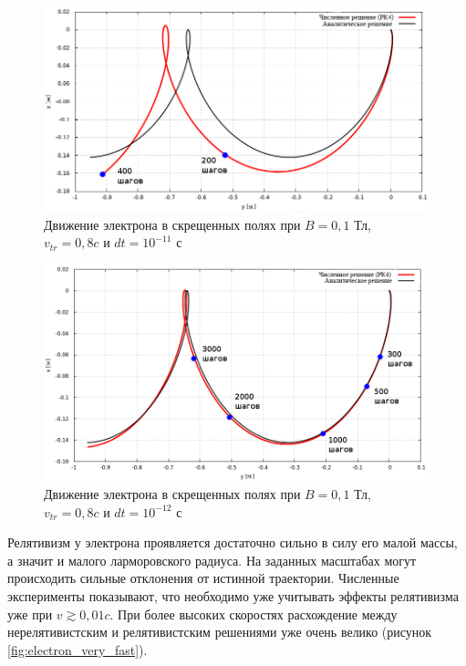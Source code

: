 \begin{figure}[h!]
\centering
\includegraphics[width=0.8\linewidth]{./fig/ch4/dt_11}
\caption{Движение электрона в скрещенных полях при $B = 0,1$ Тл, $v_{tr} = 0,8 c$ и $dt = 10^{-11}$ с}
\label{fig:dt_11}
\end{figure}
\begin{figure}[h!]
\centering
\includegraphics[width=0.8\linewidth]{./fig/ch4/dt_12}
\caption{Движение электрона в скрещенных полях при $B = 0,1$ Тл, $v_{tr} = 0,8 c$ и $dt = 10^{-12}$ с}
\label{fig:dt_12}
\end{figure}

Релятивизм у электрона проявляется достаточно сильно в силу его малой массы, а значит и малого ларморовского радиуса. На заданных масштабах могут происходить сильные отклонения от истинной траектории. Численные эксперименты показывают, что необходимо уже учитывать эффекты релятивизма уже  при $v \gtrsim 0,01 c$. При более высоких скоростях расхождение между нерелятивистским и релятивистским решениями уже очень велико (рисунок \ref{fig:electron_very_fast}).

